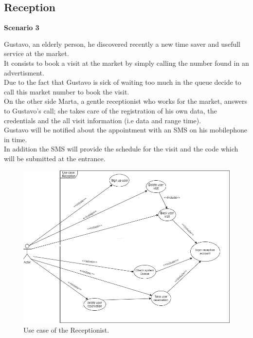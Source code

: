 \par \medskip

\subsection{Reception}
\par \medskip
{\normalsize \textbf{Scenario 3}}
\par \medskip
 Gustavo, an elderly person, he discovered recently a new time saver and usefull service at the market. \\
 It consists to book a visit at the market by simply calling the number found in an advertisment. \\
 Due to the fact that Gustavo is sick of waiting too much in the queue decide to call this market number to book the visit. \\
 On the other side Marta, a gentle receptionist who works for the market, answers to Gustavo's call; she takes care of the registration of his own data, the credentials and the all visit information (i.e data and range time).\\
  Gustavo will be notified about the appointment with an SMS on his mobilephone in time. \\
  In addition the SMS will provide the schedule for the visit and the code which will be submitted at the entrance.
 
 \par \medskip 
 
 
 \begin{figure}[h]
 	\caption{Use case of the Receptionist.}
 	\label{fig:UML}
 	
 	\centering
 	\includegraphics[width=1\textwidth, height=1\textwidth]{diagrams/UseCaseReception.png}
 	
 \end{figure}

